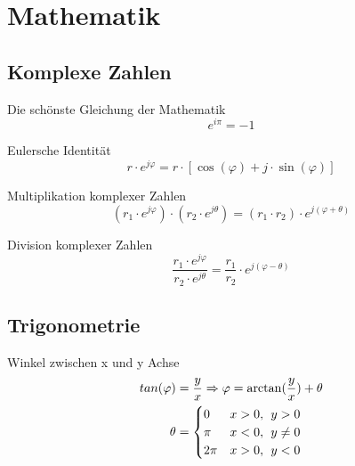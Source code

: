 \documentclass[11pt, a4paper, final, fleqn, twocolumn]{article}
\numberwithin{equation}{subsection}
\begin{document}



\section{Mathematik}

\subsection{Komplexe Zahlen}

Die schönste Gleichung der Mathematik
\begin{equation}
    e^{i\pi} = -1
\end{equation}

\noindent Eulersche Identität
\begin{equation}
    r \cdot e^{j\varphi} = r \cdot [\cos(\varphi) + j \cdot \sin(\varphi)]
\end{equation}

\noindent Multiplikation komplexer Zahlen
\begin{equation}
    (r_1 \cdot e^{j\varphi}) \cdot (r_2 \cdot e^{j\theta}) = (r_1 \cdot r_2) \cdot e^{j(\varphi + \theta)}
\end{equation}

\noindent Division komplexer Zahlen
\begin{equation}
    \frac{r_1 \cdot e^{j\varphi}}{r_2 \cdot e^{j\theta}} = \frac{r_1}{r_2} \cdot e^{j(\varphi - \theta)}
\end{equation}


\subsection{Trigonometrie}

Winkel zwischen x und y Achse
\begin{equation}
\begin{split}
    tan(\varphi) & = \frac{y}{x} \Rightarrow \varphi = \arctan(\frac{y}{x})+\theta \\
    \theta & = 
    \begin{cases}
        0 & x > 0, \hspace{1ex} y > 0 \\
        \pi & x < 0, \hspace{1ex} y \neq  0 \\
        2\pi & x > 0, \hspace{1ex} y < 0
    \end{cases}
\end{split}
\end{equation}
\end{document}
